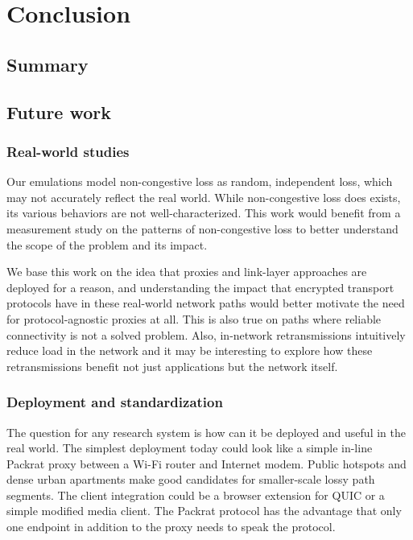 \chapter{Conclusion}
\label{sec:conclusion}

\section{Summary}
\label{sec:conclusion:summary}

\section{Future work}
\label{sec:conclusion:future}

\subsection{Real-world studies}
\label{sec:conclusion:future:real-studies}

Our emulations model non-congestive loss as random, independent loss,
which may not accurately reflect the real world. While non-congestive loss
does exists, its various behaviors are not well-characterized. This work
would benefit from a measurement study on the patterns of non-congestive loss
to better understand the scope of the problem and its impact.

We base this work on the idea that proxies and link-layer approaches are
deployed for a reason, and understanding the impact that encrypted transport
protocols have in these real-world network paths would better motivate the need
for protocol-agnostic proxies at all. This is also true on paths where
reliable connectivity is not a solved problem. Also,
in-network retransmissions intuitively reduce load in the network and it may be
interesting to explore how these retransmissions benefit not just
applications but the network itself.

\subsection{Deployment and standardization}
\label{sec:conclusion:future:deployment}

The question for any research system is how can it be deployed and useful in
the real world. The simplest deployment today could look like a simple in-line
Packrat proxy between a Wi-Fi router and Internet modem. Public hotspots and
dense urban apartments make good candidates for smaller-scale lossy path
segments.
The client integration could be a browser extension for QUIC or a simple
modified media client.
The Packrat protocol has the advantage that only one endpoint in addition to the
proxy needs to speak the protocol.

